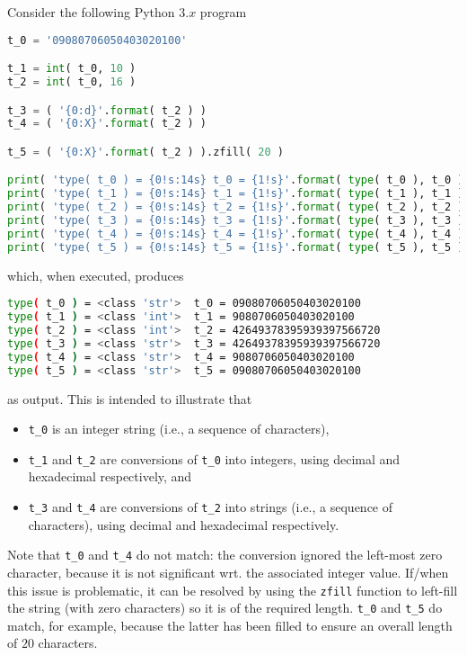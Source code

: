 Consider the following Python $3.x$ program
 
\begin{lstlisting}[language={Python}]
t_0 = '09080706050403020100'

t_1 = int( t_0, 10 )
t_2 = int( t_0, 16 )

t_3 = ( '{0:d}'.format( t_2 ) )
t_4 = ( '{0:X}'.format( t_2 ) )

t_5 = ( '{0:X}'.format( t_2 ) ).zfill( 20 )

print( 'type( t_0 ) = {0!s:14s} t_0 = {1!s}'.format( type( t_0 ), t_0 ) )
print( 'type( t_1 ) = {0!s:14s} t_1 = {1!s}'.format( type( t_1 ), t_1 ) )
print( 'type( t_2 ) = {0!s:14s} t_2 = {1!s}'.format( type( t_2 ), t_2 ) )
print( 'type( t_3 ) = {0!s:14s} t_3 = {1!s}'.format( type( t_3 ), t_3 ) )
print( 'type( t_4 ) = {0!s:14s} t_4 = {1!s}'.format( type( t_4 ), t_4 ) )
print( 'type( t_5 ) = {0!s:14s} t_5 = {1!s}'.format( type( t_5 ), t_5 ) )
\end{lstlisting}
 
\noindent
which, when executed, produces
 
\begin{lstlisting}[language={bash}]
type( t_0 ) = <class 'str'>  t_0 = 09080706050403020100
type( t_1 ) = <class 'int'>  t_1 = 9080706050403020100
type( t_2 ) = <class 'int'>  t_2 = 42649378395939397566720
type( t_3 ) = <class 'str'>  t_3 = 42649378395939397566720
type( t_4 ) = <class 'str'>  t_4 = 9080706050403020100
type( t_5 ) = <class 'str'>  t_5 = 09080706050403020100
\end{lstlisting}

\noindent
as output.  This is intended to illustrate that
 
\begin{itemize}
\item \lstinline[language={Python}]|t_0| is an
      integer string
      (i.e., a sequence of characters),
\item \lstinline[language={Python}]|t_1| 
      and 
      \lstinline[language={Python}]|t_2|
      are conversions of 
      \lstinline[language={Python}]|t_0| 
      into
      integers,
      using decimal and hexadecimal respectively,
      and
\item \lstinline[language={Python}]|t_3| 
      and
      \lstinline[language={Python}]|t_4|
      are conversions of 
      \lstinline[language={Python}]|t_2| 
      into
      strings
      (i.e., a sequence of characters),
      using decimal and hexadecimal respectively.
\end{itemize}
 
\noindent
Note that 
\lstinline[language={Python}]|t_0| 
and 
\lstinline[language={Python}]|t_4| 
do not match: 
the conversion ignored the left-most zero character, because it is not
significant wrt. the associated integer value.  
If/when this issue is problematic, it can be resolved by using the
\lstinline[language={Python}]|zfill| 
function to left-fill the string (with zero characters) so it is of the 
required length.
\lstinline[language={Python}]|t_0| 
and
\lstinline[language={Python}]|t_5| 
do     match,
for example,
because the latter has been filled to ensure an overall length of $20$ 
characters.
